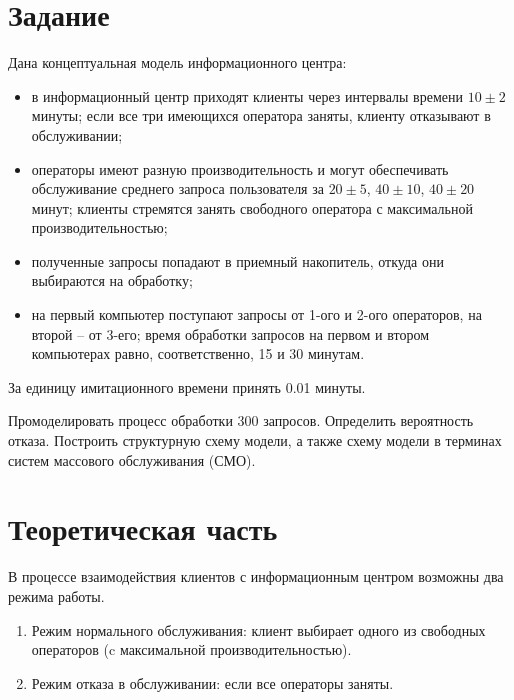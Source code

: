 \documentclass[14pt, a4paper]{extarticle}
\begin{document}


\setcounter{page}{2}

\section{Задание}



Дана концептуальная модель информационного центра: 
\begin{itemize}
	\item в информационный центр приходят клиенты через интервалы времени $10\pm2$ минуты; если все три имеющихся оператора заняты, клиенту отказывают в  обслуживании;
	\item операторы имеют разную производительность и могут  обеспечивать обслуживание среднего запроса пользователя за $20\pm5$, $40\pm10$, $40\pm20$ минут; клиенты стремятся занять свободного оператора с максимальной производительностью;
	\item полученные запросы попадают в приемный накопитель, откуда они выбираются на обработку;
	\item на первый компьютер поступают запросы от 1-ого и 2-ого операторов, на второй – от 3-его; время обработки запросов на первом и втором компьютерах равно, соответственно, 15 и 30 минутам. 
\end{itemize}

За единицу имитационного времени принять 0.01 минуты.

Промоделировать процесс обработки 300 запросов. Определить вероятность отказа. Построить структурную схему модели, а также схему модели в терминах систем массового обслуживания (СМО).





\section{Теоретическая часть}


В процессе взаимодействия клиентов с информационным центром возможны два режима работы.
\begin{enumerate}
	\item Режим нормального обслуживания: клиент выбирает одного из  свободных операторов (c максимальной производительностью).
	\item Режим отказа в обслуживании: если все операторы заняты.
\end{enumerate}
\end{document}
